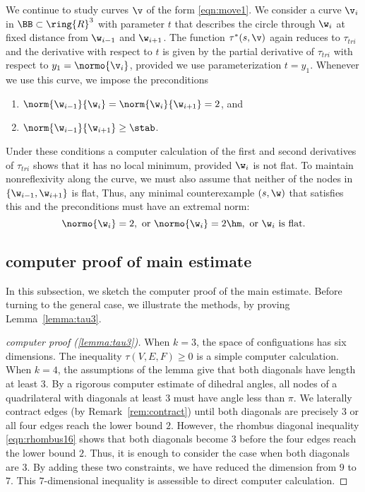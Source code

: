 \begin{remark}\label{rem:radial}
We continue to study curves $\v$ of the form \eqref{eqn:move1}.  We
consider a curve $\v_i$ in $\BB\subset\ring{R}^3$ with parameter $t$ that
describes the circle through $\w_i$ at fixed distance from $\w_{i-1}$ and
$\w_{i+1}$. 
The function $\tau^*(s,\v)$ again reduces to
$\tau_{tri}$ and the derivative with respect to $t$ is given by the
partial derivative of $\tau_{tri}$ with respect to  $y_1=\normo{\v_i}$,
provided we use parameterization $t=y_1$.
 Whenever we use this curve, we  impose the preconditions
\begin{enumerate}
\item $\norm{\w_{i-1}}{\w_i}=\norm{\w_i}{\w_{i+1}}=2$, and
\item $\norm{\w_{i-1}}{\w_{i+1}} \ge \stab$.
\end{enumerate}
Under these conditions a computer calculation of the first and second
derivatives of $\tau_{tri}$ shows that it has no local minimum, provided
$\w_i$ is not flat.
To maintain nonreflexivity along the curve, we must also assume that
 neither of the nodes in $\{\w_{i-1},\w_{i+1}\}$ is flat,
Thus,  any minimal counterexample $(s,\w)$ that satisfies this and
the preconditions
must have an extremal norm:
\begin{equation}\label{eqn:extremal}
\normo{\w_i}=2,\text{ or } \normo{\w_i}=2\hm, \text{ or } \w_i
\text{ is flat.}
\end{equation}
\end{remark}


\subsection{computer proof of main estimate}

In this subsection, we sketch the computer proof of the main estimate.
Before turning to the general case, 
we illustrate the methods, by proving Lemma~\ref{lemma:tau3}.

\begin{proof}[computer proof (\ref{lemma:tau3})]
  When $k=3$, the space of configuations has six dimensions.  The
  inequality $\tau(V,E,F)\ge0$ is a simple computer calculation.  When
  $k=4$, the assumptions of the lemma give that both diagonals have
  length at least $3$.  By a rigorous computer estimate of dihedral
  angles, all nodes of a quadrilateral with diagonals at least $3$
  must have angle less than $\pi$.  We laterally contract edges (by
  Remark~\ref{rem:contract}) until both diagonals are precisely $3$ or
  all four edges reach the lower bound $2$.  However, the rhombus
  diagonal inequality \eqref{eqn:rhombus16} shows that both diagonals
  become $3$ before the four edges reach the lower bound $2$.  Thus,
  it is enough to consider the case when both diagonals are $3$.  By
  adding these two constraints, we have reduced the dimension from $9$
  to $7$. This $7$-dimensional inequality is assessible to direct
  computer calculation.
\end{proof}


